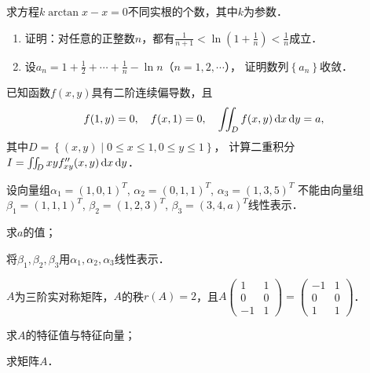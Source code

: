 \documentclass[plain,noanswer,medmath]{../../template/jnuexam}
\begin{document}
\begin{problem}[points=10]
求方程$k\arctan x - x = 0$不同实根的个数，其中$k$为参数．
\end{problem}


\begin{problem}[points=10]
\begin{enumerate}
\item
证明：对任意的正整数$n$，都有$\frac{1}{n + 1} < \ln \left(1 + \frac{1}{n} \right) < \frac{1}{n}$成立．
\item
设$a_n = 1 + \frac{1}{2} + \cdots + \frac{1}{n} - \ln n$（$n = 1,2, \cdots$），
证明数列$\left\{a_n \right\}$收敛．
\end{enumerate}
\end{problem}


\begin{problem}[points=11]
已知函数$f(x,y)$具有二阶连续偏导数，且
$$f(1,y) = 0,\quad f(x,1) = 0,\quad \iint_D f(x,y)\mathop{}\!\mathrm{d} x\mathop{}\!\mathrm{d} y = a,$$
其中$D = \left\{(x,y)\middle|0 \le x \le 1,0 \le y \le 1 \right\}$，
计算二重积分$I = \iint_D xy f''_{xy}(x,y)\mathop{}\!\mathrm{d} x\mathop{}\!\mathrm{d} y$．
\end{problem}


\begin{problem}[points=11]
设向量组$\alpha_1 = (1,0,1)^T$, $\alpha_2 = (0,1,1)^T$, $\alpha_3 = (1,3,5)^T$
不能由向量组$\beta_1 = (1,1,1)^T$, $\beta_2 = (1,2,3)^T$, $\beta_3 = (3,4,a)^T$线性表示．\par
\begin{enumerate*}
\item 求$a$的值；
\item 将$\beta_1,\beta_2,\beta_3$用$\alpha_1,\alpha_2,\alpha_3$线性表示．
\end{enumerate*}
\end{problem}


\begin{problem}[points=11]
$A$为三阶实对称矩阵，$A$的秩$r(A) = 2$，且$A\begin{pmatrix}
   1 & 1 \\
   0 & 0 \\
  -1 & 1
\end{pmatrix} = \begin{pmatrix}
  -1 & 1 \\
   0 & 0 \\
   1 & 1
\end{pmatrix}$．\par
\begin{enumerate*}
\item 求$A$的特征值与特征向量；
\item 求矩阵$A$．
\end{enumerate*}
\end{problem}
\end{document}
